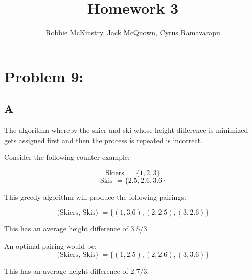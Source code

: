 \documentclass[12pt]{article}
\begin{document}
\title{Homework 3}
\author{Robbie McKinstry, Jack McQuown, Cyrus Ramavarapu}
\renewcommand{\today}{4 September 2016}
\renewcommand{\baselinestretch}{1.5}

\maketitle

\section*{Problem 9:}
\subsection*{A}

The algorithm whereby the skier and ski whose height difference
is minimized gets assigned first and then the process is repeated
is incorrect.


Consider the following counter example:

\[
\text{Skiers } = \{1,2,3\}
\]
\[
\text{Skis } = \{2.5, 2.6, 3.6\}
\]

This greedy algorithm will produce the following pairings:

\[
\text{(Skiers, Skis) } = \{(1,3.6),(2,2.5),(3,2.6)\}
\]

This has an average height difference of $3.5/3$.

An optimal pairing would be:
\[
\text{(Skiers, Skis) } = \{(1,2.5),(2,2.6),(3,3.6)\}
\]

This has an average height difference of $2.7/3$.
\end{document}

